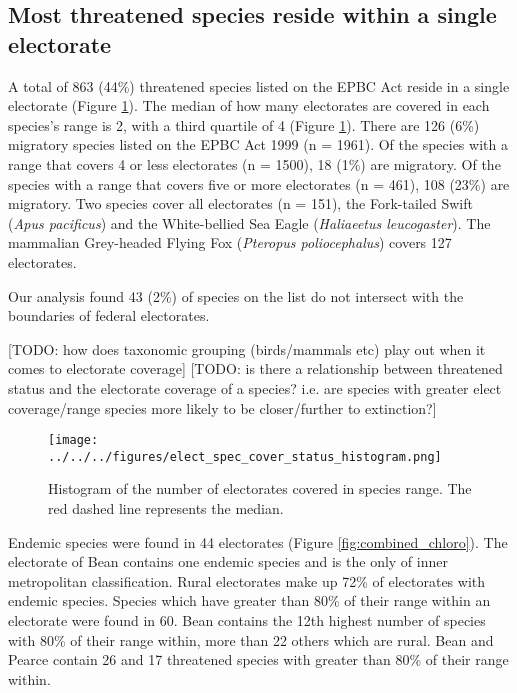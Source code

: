 \documentclass[a4paper,11pt]{article}
\begin{document}
\subsection{Most threatened species reside within a single electorate}

A total of 863 (44\%) threatened species listed on the EPBC Act reside in a single electorate (Figure \ref{fig:hist}). 
The median of how many electorates are covered in each species's range is 2, with a third quartile of 4 (Figure \ref{fig:hist}). There are 126 (6\%) migratory species listed on the EPBC Act 1999 (n = 1961). 
Of the species with a range that covers 4 or less electorates (n = 1500), 18 (1\%) are migratory. Of the species with a range that covers five or more electorates (n = 461), 108 (23\%) are migratory. Two species cover all electorates (n = 151), the Fork-tailed Swift (\emph{Apus pacificus}) and the White-bellied Sea Eagle (\emph{Haliaeetus leucogaster}). The mammalian Grey-headed Flying Fox (\emph{Pteropus poliocephalus}) covers 127 electorates. 

Our analysis found 43 (2\%) of species on the list do not intersect with the boundaries of federal electorates.

[TODO: how does taxonomic grouping (birds/mammals etc) play out when it comes to electorate coverage]
[TODO: is there a relationship between threatened status and the electorate coverage of a species? i.e. are species with greater elect coverage/range species more likely to be closer/further to extinction?]

\begin{figure}[H]
	\centering
    \texttt{[image: ../../../figures/elect\_spec\_cover\_status\_histogram.png]}
    \caption{Histogram of the number of electorates covered in species range. The red dashed line represents the median.}
    \label{fig:hist}
\end{figure}

Endemic species were found in 44 electorates (Figure \ref{fig:combined_chloro}). The electorate of Bean contains one endemic species and is the only of inner metropolitan classification. Rural electorates make up 72\% of electorates with endemic species. Species which have greater than 80\% of their range within an electorate were found in 60. Bean contains the 12th highest number of species with 80\% of their range within, more than 22 others which are rural. Bean and Pearce contain 26 and 17 threatened species with greater than 80\% of their range within.
\end{document}
